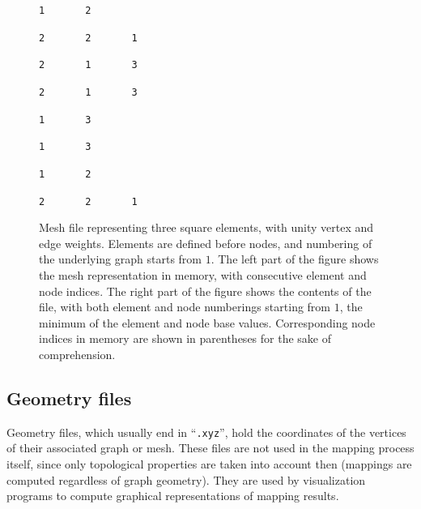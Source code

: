 \begin{figure}[hbt]
\begin{center}
\begin{minipage}[b]{7cm}
\noi
\verb+1       2+

\noi
\verb+2       2       1+

\noi
\verb+2       1       3+

\noi
\verb+2       1       3+

\noi
\verb+1       3+

\noi
\verb+1       3+

\noi
\verb+1       2+

\noi
\verb+2       2       1+
\end{minipage}
\end{center}
\caption{Mesh file representing three square elements, with unity
vertex and edge weights. Elements are defined before nodes, and
numbering of the underlying graph starts from $1$. The left part of
the figure shows the mesh representation in memory, with consecutive
element and node indices. The right part of the figure shows the
contents of the file, with both element and node numberings starting
from $1$, the minimum of the element and node base values.
Corresponding node indices in memory are shown in parentheses for the
sake of comprehension.}
\label{fig-file-smesh}
\end{figure}

\subsection{Geometry files}
\label{sec-file-geom}

Geometry files, which usually end in ``\texttt{\@.xyz}'', hold the coordinates
of the vertices of their associated graph or mesh.
These files are not used in the mapping process itself, since only
topological properties are taken into account then (mappings are
computed regardless of graph geometry).
They are used by visualization programs to compute
graphical representations of mapping results.

